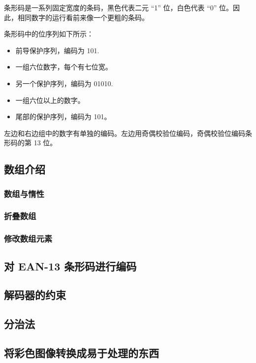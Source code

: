 \documentclass[./main.tex]{subfiles}
\begin{document}
条形码是一系列固定宽度的条码，黑色代表二元 “1” 位，白色代表 “0” 位。因此，相同数字的运行看前来像一个更粗的条码。

条形码中的位序列如下所示：

\begin{itemize}
  \item 前导保护序列，编码为 101.
  \item 一组六位数字，每个有七位宽。
  \item 另一个保护序列，编码为 01010.
  \item 一组六位以上的数字。
  \item 尾部的保护序列，编码为 101。
\end{itemize}

左边和右边组中的数字有单独的编码。左边用奇偶校验位编码，奇偶校验位编码条形码的第 13 位。

\subsection*{数组介绍}

\subsubsection*{数组与惰性}

\subsubsection*{折叠数组}

\subsubsection*{修改数组元素}

\subsection*{对 EAN-13 条形码进行编码}

\subsection*{解码器的约束}

\subsection*{分治法}

\subsection*{将彩色图像转换成易于处理的东西}
\end{document}
